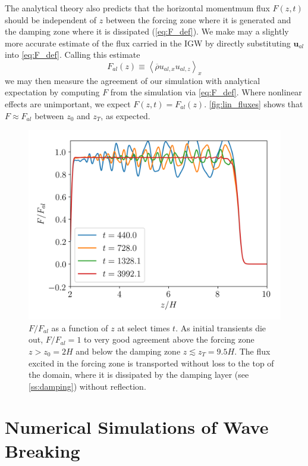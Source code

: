 \documentclass[
        fleqn,
        usenatbib,
    ]{mnras}
\newcommand*{\ev}[1]{\left\langle#1\right\rangle}
\newcommand*{\bm}[1]{\mathbf{#1}}
\begin{document}
The analytical theory also predicts that the horizontal momentmum flux $F(z, t)$
should be independent of $z$ between the forcing zone where it is generated and
the damping zone where it is dissipated (\autoref{eq:F_def}). We make may a
slightly more accurate estimate of the flux carried in the IGW by directly
substituting $\bm{u}_{al}$ into \autoref{eq:F_def}. Calling this estimate
\begin{equation}
    F_{al}(z) \equiv \ev{\overline{\rho} u_{al,x}u_{al,z}}_x
\end{equation}
we may then measure the agreement of our simulation with analytical expectation
by computing $F$ from the simulation via \autoref{eq:F_def}. Where nonlinear
effects are unimportant, we expect $F(z, t) = F_{al}(z)$.
\autoref{fig:lin_fluxes} shows that $F \approx F_{al}$ between $z_0$ and $z_T$,
as expected.
\begin{figure}
    \centering
    \includegraphics[width=\columnwidth]{plots/lin_fluxes.png}
    \caption{$F/F_{al}$ as a function of $z$ at select times $t$. As
    initial transients die out, $F / F_{al} = 1$ to very good agreement above
    the forcing zone $z > z_0 = 2H$ and below the damping zone $z \lesssim z_T =
    9.5H$. The flux excited in the forcing zone is transported without loss to
    the top of the domain, where it is dissipated by the damping layer (see
    \autoref{ss:damping}) without reflection.}\label{fig:lin_fluxes}
\end{figure}

\section{Numerical Simulations of Wave Breaking}\label{s:sim}
\end{document}
